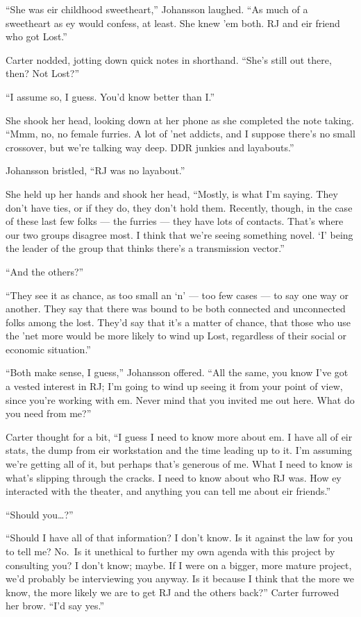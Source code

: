 ``She was eir childhood sweetheart,'' Johansson laughed. ``As much of a sweetheart as ey would confess, at least. She knew 'em both. RJ and eir friend who got Lost.''

Carter nodded, jotting down quick notes in shorthand. ``She's still out there, then? Not Lost?''

``I assume so, I guess. You'd know better than I.''

She shook her head, looking down at her phone as she completed the note taking. ``Mmm, no, no female furries. A lot of 'net addicts, and I suppose there's no small crossover, but we're talking way deep. DDR junkies and layabouts.''

Johansson bristled, ``RJ was no layabout.''

She held up her hands and shook her head, ``Mostly, is what I'm saying. They don't have ties, or if they do, they don't hold them. Recently, though, in the case of these last few folks --- the furries --- they have lots of contacts. That's where our two groups disagree most. I think that we're seeing something novel. `I' being the leader of the group that thinks there's a transmission vector.''

``And the others?''

``They see it as chance, as too small an `n' --- too few cases --- to say one way or another. They say that there was bound to be both connected and unconnected folks among the lost. They'd say that it's a matter of chance, that those who use the 'net more would be more likely to wind up Lost, regardless of their social or economic situation.''

``Both make sense, I guess,'' Johansson offered. ``All the same, you know I've got a vested interest in RJ; I'm going to wind up seeing it from your point of view, since you're working with em. Never mind that you invited me out here. What do you need from me?''

Carter thought for a bit, ``I guess I need to know more about em. I have all of eir stats, the dump from eir workstation and the time leading up to it. I'm assuming we're getting all of it, but perhaps that's generous of me. What I need to know is what's slipping through the cracks. I need to know about who RJ was. How ey interacted with the theater, and anything you can tell me about eir friends.''

``Should you\ldots{}?''

``Should I have all of that information? I don't know. Is it against the law for you to tell me? No.~Is it unethical to further my own agenda with this project by consulting you? I don't know; maybe. If I were on a bigger, more mature project, we'd probably be interviewing you anyway. Is it because I think that the more we know, the more likely we are to get RJ and the others back?'' Carter furrowed her brow. ``I'd say yes.''

